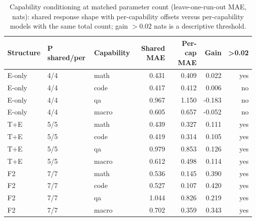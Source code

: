 \begin{table}[H]\centering\scriptsize\setlength{\tabcolsep}{2pt}
\begin{tabular}{@{}lllrrrr@{}}
\toprule
Structure & P shared/per & Capability & Shared MAE & Per-cap MAE & Gain & >0.02 \\
\midrule
E-only & 4/4 & math & 0.431 & 0.409 & 0.022 & yes \\
E-only & 4/4 & code & 0.417 & 0.412 & 0.006 & no \\
E-only & 4/4 & qa & 0.967 & 1.150 & -0.183 & no \\
E-only & 4/4 & macro & 0.605 & 0.657 & -0.052 & no \\
T+E & 5/5 & math & 0.439 & 0.327 & 0.111 & yes \\
T+E & 5/5 & code & 0.419 & 0.314 & 0.105 & yes \\
T+E & 5/5 & qa & 0.979 & 0.853 & 0.126 & yes \\
T+E & 5/5 & macro & 0.612 & 0.498 & 0.114 & yes \\
F2 & 7/7 & math & 0.536 & 0.145 & 0.390 & yes \\
F2 & 7/7 & code & 0.527 & 0.107 & 0.420 & yes \\
F2 & 7/7 & qa & 1.044 & 0.826 & 0.219 & yes \\
F2 & 7/7 & macro & 0.702 & 0.359 & 0.343 & yes \\
\bottomrule\end{tabular}
\caption{Capability conditioning at matched parameter count (leave-one-run-out MAE, nats): shared response shape with per-capability offsets versus per-capability models with the same total count; gain $>0.02$ nats is a descriptive threshold.}
\label{tab:v56_condition}\end{table}
